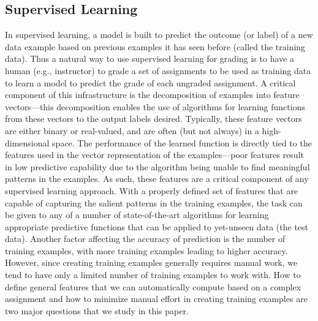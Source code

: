 \subsection{Supervised Learning}

In supervised learning, a model is built to predict the outcome (or label)
of a new data example based on previous examples it has seen before (called the
training data). Thus a natural way to use supervised learning for grading 
is to have a human (e.g., instructor) to grade a set of assignments to be used
as training data to learn a model to predict the grade of each ungraded
assignment. A critical component of this infrastructure is the
decomposition of examples into feature vectors---this decomposition enables
the use of algorithms for learning functions from these vectors to the
output labels desired. Typically, these feature vectors are either binary
or real-valued, and are often (but not always) in a high-dimensional space.
The performance of the learned function is directly tied to the features
used in the vector representation of the examples---poor features result
in low predictive capability due to the algorithm being unable to find
meaningful patterns in the examples. As such, these features are a 
critical component of any supervised learning approach. With a properly
defined set of features that are capable of capturing the salient patterns
in the training examples, the task can be given to any of a number of
state-of-the-art algorithms for learning appropriate predictive functions
that can be applied to yet-unseen data (the test data). Another factor
affecting the accuracy of prediction is the number of training examples, with 
more training examples leading to higher accuracy. However, since 
creating training examples generally requires manual work, we tend
to have only a limited number of training examples to work with. 
How to define general features that we can automatically compute 
based on a complex assignment and how to minimize manual effort
in creating training examples are two major questions that we study in this paper. 


